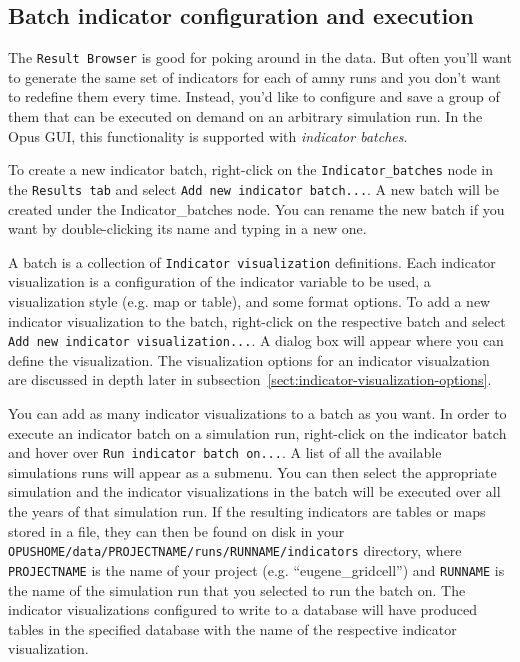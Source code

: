 \subsection{Batch indicator configuration and execution}

The \verb#Result Browser# is good for poking around in the
data. But often you'll want to generate the same
set of indicators for each of amny runs and you don't want to
redefine them every time. Instead, you'd like to configure and save a
group of them that can be executed on demand on an arbitrary
simulation run. In the Opus GUI, this functionality is supported with
\emph{indicator batches}. 

To create a new indicator batch, right-click on the
\verb#Indicator_batches# node in the \verb#Results tab# and select
\verb#Add new indicator batch...#. A new batch will be created
under the Indicator_batches node. You can rename the new batch if you
want by double-clicking its name and typing in a new one.

A batch is a collection of \verb#Indicator visualization#
definitions. Each indicator visualization is a configuration of
the indicator variable to be used, a visualization style (e.g. map or
table), and some format options. To add a new indicator visualization
to the batch, right-click on the respective batch and select
\verb#Add new indicator visualization...#. A dialog box will
appear where you can define the visualization. The visualization
options for an indicator visualzation are discussed in depth later in
subsection~\ref{sect:indicator-visualization-options}.

You can add as many indicator visualizations to a batch as you want.
In order to execute an indicator batch on a simulation run,
right-click on the indicator batch and hover over
 \verb#Run indicator batch on...#. A list of all the available 
 simulations runs will
appear as a submenu. You can then select the appropriate simulation
and the indicator visualizations in the batch will be executed over
all the years of that simulation run. If the resulting indicators are
tables or maps stored in a file, they can then be found on disk in
your \verb#OPUSHOME/data/PROJECTNAME/runs/RUNNAME/indicators#
directory, where \verb#PROJECTNAME# is the name of your project (e.g.
``eugene\_gridcell'') and \verb#RUNNAME# is the name of the
simulation run that you selected to run the batch on. The indicator
visualizations configured to write to a database will have produced
tables in the specified database with the name of the respective
indicator visualization. 


